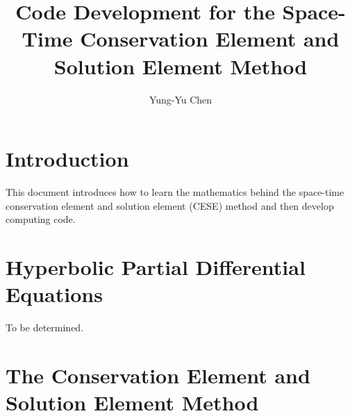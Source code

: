 \documentclass{turgon}
\title{
%
Code Development for the Space-Time Conservation Element and Solution Element
Method
%
}
\author{
%
Yung-Yu Chen
%
}
\begin{document}
\maketitle

\tableofcontents

\chapter*{Introduction}

This document introduces how to learn the mathematics behind the space-time
conservation element and solution element (CESE) method and then develop
computing code.

\chapter{Hyperbolic Partial Differential Equations}
\label{c:hyper}

To be determined.


\chapter{The Conservation Element and Solution Element Method}
\label{c:cese}

\end{document}

